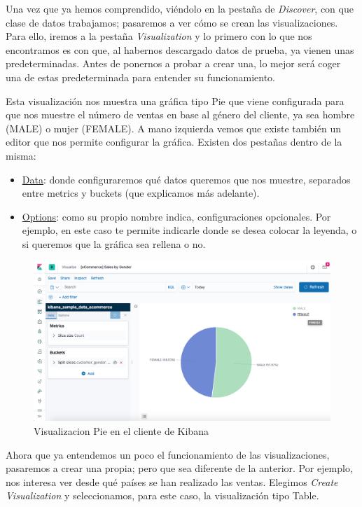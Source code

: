 \documentclass[a4paper, 12pt]{book}
\begin{document}
Una vez que ya hemos comprendido, viéndolo en la pestaña de \textit{Discover}, con que clase de datos trabajamos; pasaremos a ver cómo se crean las visualizaciones. Para ello, iremos a la pestaña \textit{Visualization} y lo primero con lo que nos encontramos es con que, al habernos descargado datos de prueba, ya vienen unas predeterminadas. Antes de ponernos a probar a crear una, lo mejor será coger una de estas predeterminada para entender su funcionamiento.

Esta visualización nos muestra una gráfica tipo Pie que viene configurada para que nos muestre el número de ventas en base al género del cliente, ya sea hombre (MALE) o mujer (FEMALE). A mano izquierda vemos que existe también un editor que nos permite configurar la gráfica. Existen dos pestañas dentro de la misma:

\begin{itemize}
    \item \underline{Data}: donde configuraremos qué datos queremos que nos muestre, separados entre metrics y buckets (que explicamos más adelante).
    \item \underline{Options}: como su propio nombre indica, configuraciones opcionales. Por ejemplo, en este caso te permite indicarle donde se desea colocar la leyenda, o si queremos que la gráfica sea rellena o no.
\end{itemize}

\begin{figure}[H]
  \centering
  \includegraphics[width=12cm, keepaspectratio]{img/development/Kibana-visualization-pie.png}
  \caption{Visualizacion Pie en el cliente de Kibana}
  \label{fig:Kibanapie}
\end{figure}

Ahora que ya entendemos un poco el funcionamiento de las visualizaciones, pasaremos a crear una propia; pero que sea diferente de la anterior. Por ejemplo, nos interesa ver desde qué países se han realizado las ventas. Elegimos \textit{Create Visualization} y seleccionamos, para este caso, la visualización tipo Table. 
\end{document}
